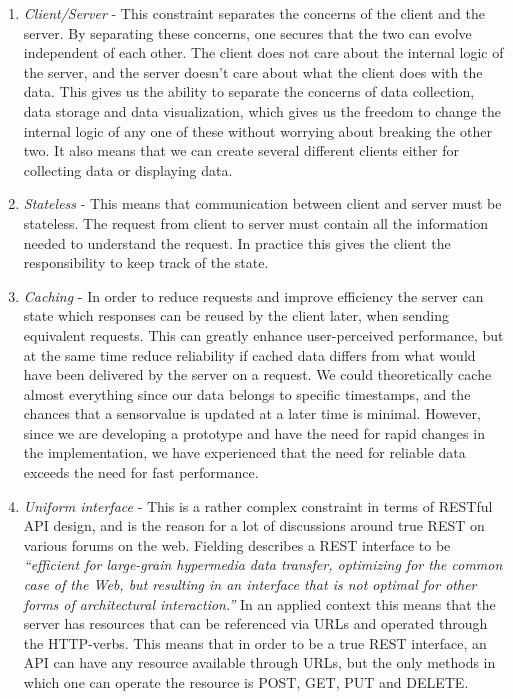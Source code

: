 \begin{enumerate}
\item{} \emph{Client/Server} - This constraint separates the concerns of the client and the server. By separating these concerns, one secures that the two can evolve independent of each other. The client does not care about the internal logic of the server, and the server doesn't care about what the client does with the data. This gives us the ability to separate the concerns of data collection, data storage and data visualization, which gives us the freedom to change the internal logic of any one of these without worrying about breaking the other two. It also means that we can create several different clients either for collecting data or displaying data.

\item{} \emph{Stateless} - This means that communication between client and server must be stateless. The request from client to server must contain all the information needed to understand the request. In practice this gives the client the responsibility to keep track of the state.

\item{} \emph{Caching} - In order to reduce requests and improve efficiency the server can state which responses can be reused by the client later, when sending equivalent requests. This can greatly enhance user-perceived performance, but at the same time reduce reliability if cached data differs from what would have been delivered by the server on a request. We could theoretically cache almost everything since our data belongs to specific timestamps, and the chances that a sensorvalue is updated at a later time is minimal. However, since we are developing a prototype and have the need for rapid changes in the implementation, we have experienced that the need for reliable data exceeds the need for fast performance.

\item{} \emph{Uniform interface} - This is a rather complex constraint in terms of RESTful API design, and is the reason for a lot of discussions around true REST on various forums on the web. Fielding describes a REST interface to be \emph{“efficient for large-grain hypermedia data transfer, optimizing for the common case of the Web, but resulting in an interface that is not optimal for other forms of architectural interaction.”} \citep{fielding2000architectural} In an applied context this means that the server has resources that can be referenced via URLs and operated through the HTTP-verbs. This means that in order to be a true REST interface, an API can have any resource available through URLs, but the only methods in which one can operate the resource is POST, GET, PUT and DELETE.


\end{enumerate}
